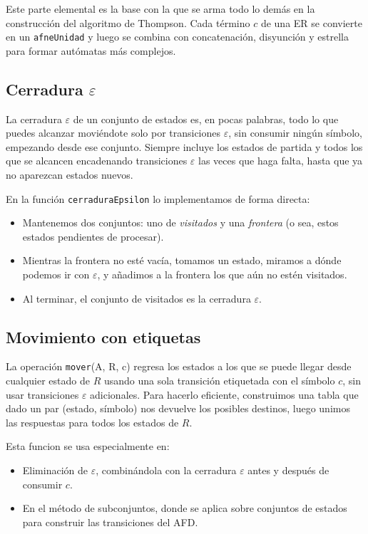 Este parte elemental es la base con la que se arma todo lo demás en la construcción del algoritmo de Thompson. Cada término $c$ de una ER se convierte en un \texttt{afneUnidad} y luego se combina con concatenación, disyunción y estrella para formar autómatas más complejos.

\subsection{Cerradura $\varepsilon$}


La cerradura $\varepsilon$ de un conjunto de estados es, en pocas palabras, todo lo que puedes alcanzar moviéndote solo por transiciones $\varepsilon$, sin consumir ningún símbolo, empezando desde ese conjunto. Siempre incluye los estados de partida y todos los que se alcancen encadenando transiciones $\varepsilon$ las veces que haga falta, hasta que ya no aparezcan estados nuevos.

En la función \texttt{cerraduraEpsilon} lo implementamos de forma directa:

\begin{itemize}
    \item Mantenemos dos conjuntos: uno de \emph{visitados} y una \emph{frontera} (o sea, estos estados pendientes de procesar).
    \item Mientras la frontera no esté vacía, tomamos un estado, miramos a dónde podemos ir con $\varepsilon$, y añadimos a la frontera los que aún no estén visitados.
    \item Al terminar, el conjunto de visitados es la cerradura $\varepsilon$.
\end{itemize}

\subsection{Movimiento con etiquetas}

La operación \texttt{mover}(A, R, c) regresa los estados a los que se puede llegar desde cualquier estado de \(R\) usando una sola transición etiquetada con el símbolo \(c\), sin usar transiciones $\varepsilon$ adicionales. Para hacerlo eficiente, construimos una tabla que dado un par (estado, símbolo) nos devuelve los posibles destinos, luego unimos las respuestas para todos los estados de \(R\).

Esta funcion se usa especialmente en:
\begin{itemize}
    \item Eliminación de $\varepsilon$, combinándola con la cerradura $\varepsilon$ antes y después de consumir \(c\).
    \item En el método de subconjuntos, donde se aplica sobre conjuntos de estados para construir las transiciones del AFD.
\end{itemize}

